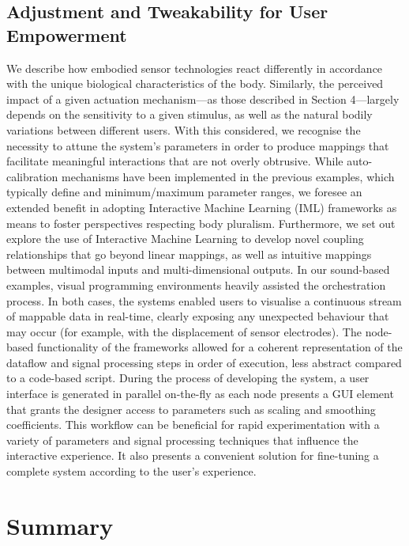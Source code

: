 \subsection{Adjustment and Tweakability for User Empowerment}
We describe how embodied sensor technologies react differently in accordance with the unique biological characteristics of the body. Similarly, the perceived impact of a given actuation mechanism—as those described in Section 4—largely depends on the sensitivity to a given stimulus, as well as the natural bodily variations between different users. With this considered, we recognise the necessity to attune the system’s parameters in order to produce mappings that facilitate meaningful interactions that are not overly obtrusive. While auto-calibration mechanisms have been implemented in the previous examples, which typically define and minimum/maximum parameter ranges, we foresee an extended benefit in adopting Interactive Machine Learning (IML) \cite{fails_interactive_2003,amershi_power_2014} frameworks as means to foster perspectives respecting body pluralism. Furthermore, we set out explore the use of Interactive Machine Learning to develop novel coupling relationships that go beyond linear mappings, as well as intuitive mappings between multimodal inputs and multi-dimensional outputs. In our sound-based examples, visual programming environments heavily assisted the orchestration process. In both cases, the systems enabled users to visualise a continuous stream of mappable data in real-time, clearly exposing any unexpected behaviour that may occur (for example, with the displacement of sensor electrodes). The node-based functionality of the frameworks allowed for a coherent representation of the dataflow and signal processing steps in order of execution, less abstract compared to a code-based script. During the process of developing the system, a user interface is generated in parallel on-the-fly as each node presents a GUI element that grants the designer access to parameters such as scaling and smoothing coefficients.
This workflow can be beneficial for rapid experimentation with a variety of parameters and signal processing techniques that influence the interactive experience. It also presents a convenient solution for fine-tuning a complete system according to the user’s experience.

\section{Summary}

